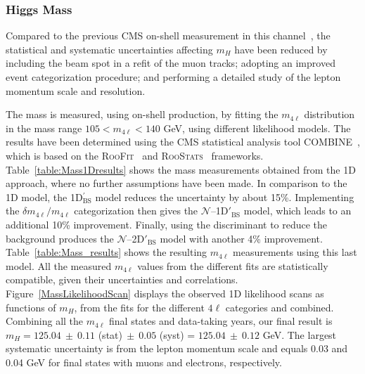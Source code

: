\subsubsection{Higgs Mass}

Compared to the previous CMS on-shell \Hboson measurement in this channel~\cite{Sirunyan:2017exp}, 
the statistical and systematic uncertainties affecting $m_{H}$ have been reduced by including the beam spot in a refit of the muon tracks; adopting an improved event categorization procedure; and performing a detailed study of the lepton momentum scale and resolution.

The \Hboson mass is measured, using on-shell production, by fitting the $m_{4\ell}$ distribution in the mass range $105< m_{4\ell} < 140$ GeV, using different likelihood models. %
The results have been determined using the CMS statistical analysis tool COMBINE~\cite{CMS:2024onh}, 
which is based on the \textsc{RooFit}~\cite{Verkerke:2003ir} and \textsc{RooStats}~\cite{Moneta:2010pm} frameworks.\\
Table~\ref{table:Mass1Dresults} shows
the mass measurements obtained from the 1D approach, where no further assumptions have been made.
In comparison to the 1D model, the 1D$^{'}_\text{BS}$ model reduces the uncertainty by about 15\%.
Implementing the $\delta m_{4\ell} / m_{4\ell}$ categorization then gives the $\mathcal{N}$--1D$'_\text{BS}$ model, which leads to an additional 10\% improvement. 
Finally, using the \Dkinbkg discriminant to reduce the background produces the $\mathcal{N}$--2D$'_\text{BS}$ model with another 4\% improvement. 
Table~\ref{table:Mass_results} shows the resulting $m_{4\ell}$ measurements using this last model. 
All the measured $m_{4\ell}$ values from the different fits are statistically compatible, given their uncertainties and correlations.
Figure~\ref{MassLikelihoodScan} displays the observed 1D likelihood scans as functions of $m_H$, from the fits for the different $4\ell$ categories and combined.
Combining all the $m_{4\ell}$ final states and data-taking years, our final result is 
$m_H = 125.04~\pm~0.11$ (stat)$~\pm~0.05$ (syst) = $125.04~\pm~0.12$ GeV.
The largest systematic uncertainty is from the lepton momentum scale and equals 0.03 and 0.04  GeV for final states with muons and electrons, respectively.

